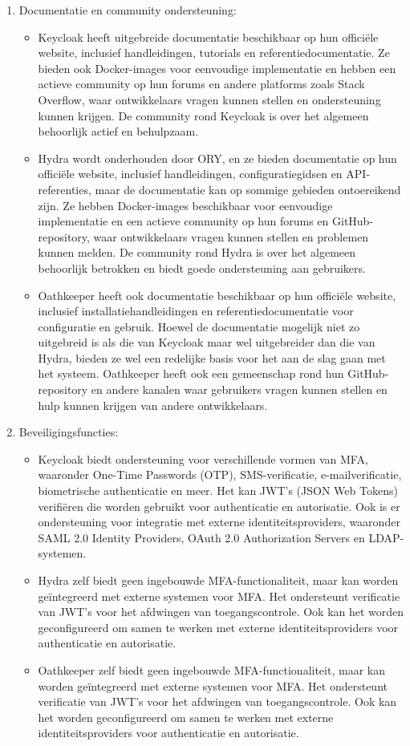\begin{enumerate}
  \item Documentatie en community ondersteuning:
  \begin{itemize}
    \item Keycloak heeft uitgebreide documentatie beschikbaar op hun officiële website, inclusief handleidingen, tutorials en referentiedocumentatie. Ze bieden ook Docker-images voor eenvoudige implementatie en hebben een actieve community op hun forums en andere platforms zoals Stack Overflow, waar ontwikkelaars vragen kunnen stellen en ondersteuning kunnen krijgen. De community rond Keycloak is over het algemeen behoorlijk actief en behulpzaam.
    \item Hydra wordt onderhouden door ORY, en ze bieden documentatie op hun officiële website, inclusief handleidingen, configuratiegidsen en API-referenties, maar de documentatie kan op sommige gebieden ontoereikend zijn. Ze hebben Docker-images beschikbaar voor eenvoudige implementatie en een actieve community op hun forums en GitHub-repository, waar ontwikkelaars vragen kunnen stellen en problemen kunnen melden. De community rond Hydra is over het algemeen behoorlijk betrokken en biedt goede ondersteuning aan gebruikers.
    \item Oathkeeper heeft ook documentatie beschikbaar op hun officiële website, inclusief installatiehandleidingen en referentiedocumentatie voor configuratie en gebruik. Hoewel de documentatie mogelijk niet zo uitgebreid is als die van Keycloak maar wel uitgebreider dan die van Hydra, bieden ze wel een redelijke basis voor het aan de slag gaan met het systeem. Oathkeeper heeft ook een gemeenschap rond hun GitHub-repository en andere kanalen waar gebruikers vragen kunnen stellen en hulp kunnen krijgen van andere ontwikkelaars.
  \end{itemize}
  
  \item Beveiligingsfuncties:
  \begin{itemize}
    \item Keycloak biedt ondersteuning voor verschillende vormen van MFA, waaronder One-Time Passwords (OTP), SMS-verificatie, e-mailverificatie, biometrische authenticatie en meer. Het kan JWT's (JSON Web Tokens) verifiëren die worden gebruikt voor authenticatie en autorisatie. Ook is er ondersteuning voor integratie met externe identiteitsproviders, waaronder SAML 2.0 Identity Providers, OAuth 2.0 Authorization Servers en LDAP-systemen.
    \item Hydra zelf biedt geen ingebouwde MFA-functionaliteit, maar kan worden geïntegreerd met externe systemen voor MFA. Het ondersteunt verificatie van JWT's voor het afdwingen van toegangscontrole. Ook kan het worden geconfigureerd om samen te werken met externe identiteitsproviders voor authenticatie en autorisatie.
    \item Oathkeeper zelf biedt geen ingebouwde MFA-functionaliteit, maar kan worden geïntegreerd met externe systemen voor MFA. Het ondersteunt verificatie van JWT's voor het afdwingen van toegangscontrole. Ook kan het worden geconfigureerd om samen te werken met externe identiteitsproviders voor authenticatie en autorisatie.
  \end{itemize}
  

\end{enumerate}
